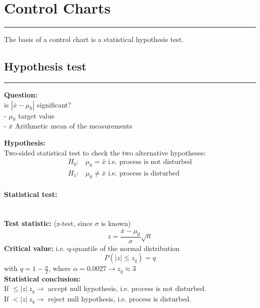 \section{Control Charts}
\noindent\rule[\linienAbstand]{\linewidth}{\linienDickeDick}
The basis of a control chart is a statistical hypothesis test.

\subsection{Hypothesis test}
\noindent\rule[\linienAbstand]{\linewidth}{\linienDicke}

\textbf{Question:}\\
is $\left|\bar{x} - \mu_0\right|$ significant?\\
 - $\mu_0$ target value\\
 - $\bar{x}$ Arithmetic mean of the measurements


\textbf{Hypothesis:}\\
Two-sided statistical test to check the two alternative hypotheses:
\begin{equation}
  \begin{split}
    H_0:& \mu_0 = \bar{x} \text{ i.e. process is not disturbed}\\
    H_1:& \mu_0 \neq \bar{x} \text{ i.e. process is disturbed}
  \end{split}
\end{equation}

\paragraph{Statistical test:}\mbox{}\\
\textbf{Test statistic:} (z-test, since $\sigma$ is known)
\begin{equation}
  z = \frac{\bar{x}-\mu_0}{\sigma}\sqrt{n}
\end{equation}
\textbf{Critical value:} i.e. q-quantile of the normal distribution
\begin{equation}
  P(|z| \leq z_q) = q
\end{equation}
with $q = 1- \frac{\alpha}{2}$, where $\alpha = 0.0027 \rightarrow z_q \approx 3$\\

\textbf{Statistical conclusion:}\\
If $\leq |z| \ z_q \rightarrow$ accept null hypothesis, i.e. process is not disturbed.\\
If $< |z| \ z_q \rightarrow$ reject null hypothesis, i.e. process is disturbed.\\

